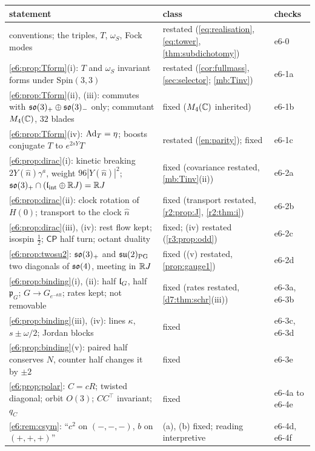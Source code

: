 \begin{table}[htbp]
\centering
\footnotesize
\begin{tabular}{@{}>{\raggedright\arraybackslash}p{8.0cm}>{\raggedright\arraybackslash}p{4.7cm}>{\raggedright\arraybackslash}p{2.1cm}@{}}
\toprule
statement & class & checks\\
\midrule
conventions; the triples, $T$, $\omega_S$, Fock modes & restated (\cref{eq:realisation}, \eqref{eq:tower}, \cref{thm:subdichotomy}) & e6-0\\
\cref{e6:prop:Tform}(i): $T$ and $\omega_S$ invariant forms under $\mathrm{Spin}(3,3)$ & restated (\cref{cor:fullmass}, \cref{sec:selector}; \cref{mb:Tinv}) & e6-1a\\
\cref{e6:prop:Tform}(ii), (iii): commutes with $\mathfrak{so}(3)_+\oplus\mathfrak{so}(3)_-$ only; commutant $M_4(\mathbb{C})$, $32$ blades & fixed ($M_4(\mathbb{C})$ inherited) & e6-1b\\
\cref{e6:prop:Tform}(iv): $\operatorname{Ad}_T=\eta$; boosts conjugate $T$ to $e^{2sY}T$ & restated (\cref{en:parity}); fixed & e6-1c\\
\cref{e6:prop:dirac}(i): kinetic breaking $2Y(\hat n)\gamma^a$, weight $96|Y(\hat n)|^2$; $\mathfrak{so}(3)_+\cap(\mathfrak l_{\rm int}\oplus\mathbb{R} J)=\mathbb{R} J$ & fixed (covariance restated, \cref{mb:Tinv}(ii)) & e6-2a\\
\cref{e6:prop:dirac}(ii): clock rotation of $H(0)$; transport to the clock $\hat n$ & fixed (transport restated, \cref{r2:prop:J}, \cref{r2:thm:i}) & e6-2b\\
\cref{e6:prop:dirac}(iii), (iv): rest flow kept; isospin $\tfrac12$; $\mathsf{CP}$ half turn; octant duality & fixed; (iv) restated (\cref{r3:prop:odd}) & e6-2c\\
\cref{e6:prop:twosu2}: $\mathfrak{so}(3)_+$ and $\mathfrak{su}(2)_{\rm PG}$ two diagonals of $\mathfrak{so}(4)$, meeting in $\mathbb{R} J$ & fixed ((v) restated, \cref{prop:gauge1}) & e6-2d\\
\cref{e6:prop:binding}(i), (ii): half $\mathfrak l_G$, half $\mathfrak p_G$; $G\to G_{e^{-\theta R}}$; rates kept; not removable & fixed (rates restated, \cref{d7:thm:schr}(iii)) & e6-3a, e6-3b\\
\cref{e6:prop:binding}(iii), (iv): lines $\kappa$, $s\pm\omega/2$; Jordan blocks & fixed & e6-3c, e6-3d\\
\cref{e6:prop:binding}(v): paired half conserves $N$, counter half changes it by $\pm2$ & fixed & e6-3e\\
\cref{e6:prop:polar}: $C=cR$; twisted diagonal; orbit $O(3)$; $CC^{\!\top}$ invariant; $q_C$ & fixed & e6-4a to e6-4e\\
\cref{e6:rem:csym}: ``$c^2$ on $(-,-,-)$, $b$ on $(+,+,+)$'' & (a), (b) fixed; reading interpretive & e6-4d, e6-4f\\

\end{tabular}
\end{table}
